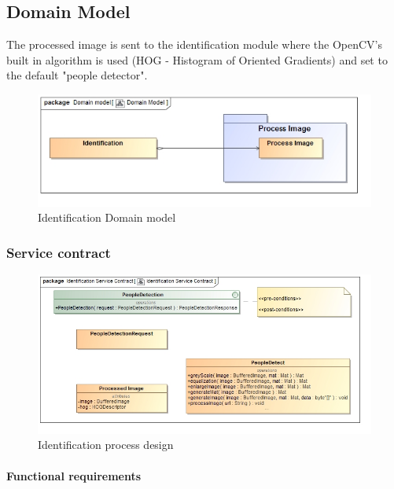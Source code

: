 \documentclass[a4paper,12pt]{report}
\begin{document}
	\FloatBarrier	
	\subsection {Domain Model}
		The processed image is sent to the identification module where the OpenCV's built in algorithm is used (HOG - Histogram of Oriented Gradients) and set to the default "people detector".
		\begin{figure}[htb]
			\centering
			\includegraphics [scale=0.5]{../Diagrams/Identification_Domain_Model.jpg}
			\caption{Identification Domain model}
		\end{figure}	

		\FloatBarrier	
		\subsubsection {Service contract}
			\begin{figure}[htb]
				\centering
				\includegraphics [scale=0.5]{../Diagrams/Identification_Service_Contract.jpg}
				\caption{Identification process design}
			\end{figure}	

			\FloatBarrier				
			\paragraph {Functional requirements}
			
			\FloatBarrier	
\end{document}
